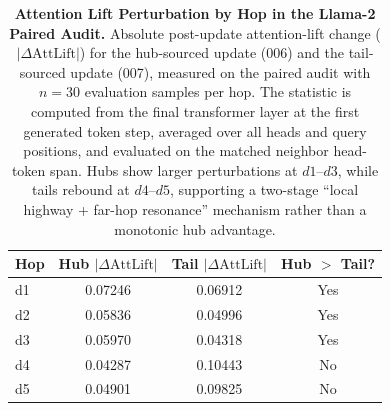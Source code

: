 \begin{table}[t]
\centering
\small
\begin{tabular}{lccc}
\toprule
\textbf{Hop} & \textbf{Hub $|\Delta \mathrm{AttLift}|$} & \textbf{Tail $|\Delta \mathrm{AttLift}|$} & \textbf{Hub $>$ Tail?} \\
\midrule
d1 & 0.07246 & 0.06912 & Yes \\
d2 & 0.05836 & 0.04996 & Yes \\
d3 & 0.05970 & 0.04318 & Yes \\
d4 & 0.04287 & 0.10443 & No \\
d5 & 0.04901 & 0.09825 & No \\
\bottomrule
\end{tabular}
\caption{\label{tab:attention_lift_by_hop} \textbf{Attention Lift Perturbation by Hop in the Llama-2 Paired Audit.} Absolute post-update attention-lift change ($|\Delta \mathrm{AttLift}|$) for the hub-sourced update (006) and the tail-sourced update (007), measured on the paired audit with $n=30$ evaluation samples per hop. The statistic is computed from the final transformer layer at the first generated token step, averaged over all heads and query positions, and evaluated on the matched neighbor head-token span. Hubs show larger perturbations at $d1$--$d3$, while tails rebound at $d4$--$d5$, supporting a two-stage ``local highway + far-hop resonance'' mechanism rather than a monotonic hub advantage.}
\end{table}

